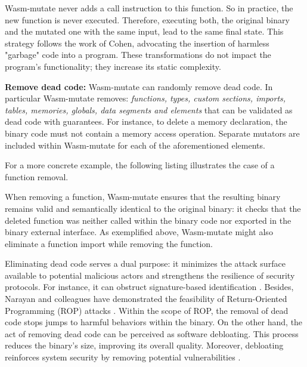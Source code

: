 \documentclass[sigplan,screen]{acmart}
\newcommand*\badge[1]{ \colorbox{red}{\color{white}#1}}
\newcommand{\tool}{Wasm-mutate\xspace}
\newcommand{\todo}[1]{%
\refstepcounter{todo}
\noindent\textbf{\badge{TODO}} {\color{red}#1}
\addcontentsline{td}{todo}
{\color{red}\thesection.\thetodo\xspace #1}}
\begin{document}


\tool never adds a call instruction to this function.
So in practice, the new function is never executed.
Therefore, executing both, the original binary and the mutated one with the same input, lead to the same final state.
This strategy follows the work of Cohen, advocating the insertion of harmless "garbage" code into a program. 
These transformations do not impact the program's functionality; they increase its static complexity.

\textbf{Remove dead code:} \tool can randomly remove dead code.
In particular \tool removes: \emph{functions, types, custom sections, imports, tables, memories, globals, data segments and elements} that can be validated as dead code with guarantees.
For instance, to delete a memory declaration, the binary code must not contain a memory access operation. 
Separate mutators are included within \tool for each of the aforementioned elements.

For a more concrete example, the following listing illustrates the case of a function removal.



When removing a function, \tool ensures that the resulting binary remains valid and semantically identical to the original binary: it checks  that the deleted function was neither called within the binary code nor exported in the binary external interface. 
As exemplified above, \tool might also eliminate a function import while removing the function. 


Eliminating dead code serves a dual purpose: it minimizes the attack surface available to potential malicious actors and strengthens the resilience of security protocols. 
For instance, it can obstruct signature-based identification \cite{CABRERAARTEAGA2023103296}.
Besides, Narayan and colleagues have demonstrated the feasibility of Return-Oriented Programming (ROP) attacks \cite{Swivel}.
Within the scope of ROP, the removal of dead code stops jumps to harmful behaviors within the binary. 
On the other hand, the act of removing dead code can be perceived as software debloating. 
This process reduces the binary's size, improving its overall quality. 
Moreover, debloating reinforces system security by removing potential vulnerabilities \cite{236200}.
\end{document}
